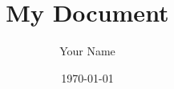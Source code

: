 \documentclass{article}
\begin{document}
\title{My Document}
\author{Your Name}
\date{\today}

\maketitle

\end{document}
